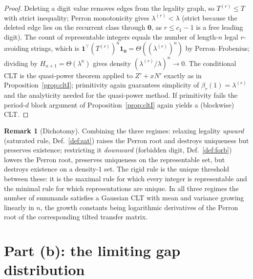 \documentclass[12pt]{article}
\theoremstyle{definition}
\newtheorem{remark}{Remark}
\newcommand{\one}{\mathbf{1}}
\begin{document}
\begin{proof}
Deleting a digit value removes edges from the legality graph, so
$T^{(r)}\le T$ with strict inequality; Perron monotonicity gives
$\lambda^{(r)}<\lambda$ (strict because the deleted edge lies on the recurrent
class through $\mathbf 0$, as $r\le c_1-1$ is a free leading digit). The count of
representable integers equals the number of length-$n$ legal $r$-avoiding
strings, which is $\one^\top (T^{(r)})^n\one_{\mathbf 0}=\Theta((\lambda^{(r)})^n)$
by Perron--Frobenius; dividing by $H_{n+1}=\Theta(\lambda^n)$ gives density
$(\lambda^{(r)}/\lambda)^n\to0$. The conditional CLT is the quasi-power theorem
applied to $Z'+xN'$ exactly as in Proposition~\ref{prop:cltI}; primitivity again
guarantees simplicity of $\beta_r(1)=\lambda^{(r)}$ and the analyticity needed
for the quasi-power method. If primitivity fails the period-$d$ block argument of
Proposition~\ref{prop:cltI} again yields a (blockwise) CLT.
\end{proof}

\begin{remark}[Dichotomy]
Combining the three regimes: relaxing legality \emph{upward} (saturated rule,
Def.~\ref{def:sat}) raises the Perron root and destroys uniqueness but preserves
existence; restricting it \emph{downward} (forbidden digit, Def.~\ref{def:forb})
lowers the Perron root, preserves uniqueness on the representable set, but
destroys existence on a density-$1$ set. The rigid rule is the unique threshold
between these: it is the maximal rule for which every integer is representable
and the minimal rule for which representations are unique. In all three regimes
the number of summands satisfies a Gaussian CLT with mean and variance growing
linearly in $n$, the growth constants being logarithmic derivatives of the Perron
root of the corresponding tilted transfer matrix.
\end{remark}

\section{Part (b): the limiting gap distribution}
\end{document}
